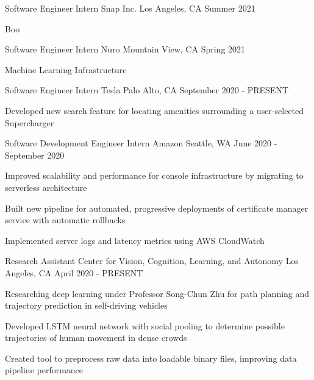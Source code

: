 \documentclass[12pt, letterpaper]{awesome-cv}
\begin{document}
\begin{cventries}
  \cventry
    {Sof\/tware Engineer Intern} %
    {Snap Inc.} %
    {Los Angeles, CA} %
    {Summer 2021} %
    {
      \begin{cvitems} %
        \item {Boo}
      \end{cvitems}
    }

  \cventry
    {Sof\/tware Engineer Intern} %
    {Nuro} %
    {Mountain View, CA} %
    {Spring 2021} %
    {
      \begin{cvitems} %
        \item {Machine Learning Infrastructure}
      \end{cvitems}
    }

  \cventry
    {Sof\/tware Engineer Intern} %
    {Tesla} %
    {Palo Alto, CA} %
    {September 2020 - PRESENT} %
    {
      \begin{cvitems} %
        \item {Developed new search feature for locating amenities surrounding a user-selected Supercharger}
      \end{cvitems}
    }

  \cventry
    {Sof\/tware Development Engineer Intern} %
    {Amazon} %
    {Seattle, WA} %
    {June 2020 - September 2020} %
    {
      \begin{cvitems} %
        \item {Improved scalability and performance for console infrastructure by migrating to serverless architecture} 
        \item {Built new pipeline for automated, progressive deployments of certificate manager service with automatic rollbacks}
        \item {Implemented server logs and latency metrics using AWS CloudWatch }
      \end{cvitems}
    }

  \cventry
    {Research Assistant} %
    {Center for Vision, Cognition, Learning, and Autonomy} %
    {Los Angeles, CA} %
    {April 2020 - PRESENT} %
    {
      \begin{cvitems} %
        \item {Researching deep learning under Professor Song-Chun Zhu for path planning and trajectory prediction in self-driving vehicles}
        \item {Developed LSTM neural network with social pooling to determine possible trajectories of human movement in dense crowds}
        \item {Created tool to preprocess raw data into loadable binary files, improving data pipeline performance}
      \end{cvitems}
    }


\end{cventries}
\end{document}

